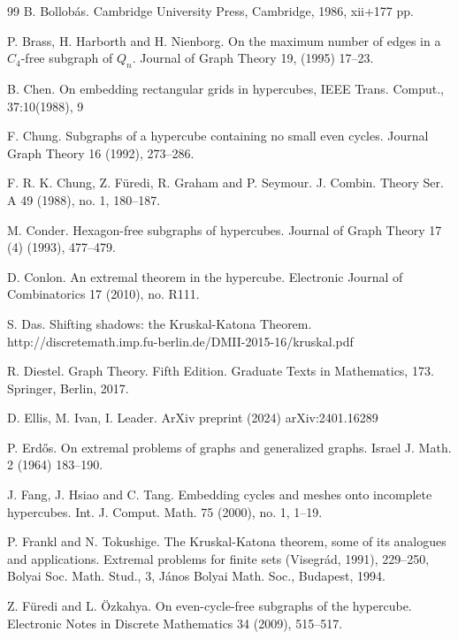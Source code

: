 \documentclass[11pt, a4paper]{article}
\begin{document}
\begin{thebibliography}{99}
 B. Bollob\'as. 
Cambridge University Press, Cambridge, 1986, xii+177 pp.


P. Brass, H. Harborth and H. Nienborg.
\newblock On the maximum number of edges in a $C_4$-free subgraph of $Q_n$.
Journal of Graph Theory 19, (1995)  17--23.


 B. Chen.  On embedding rectangular grids in hypercubes, IEEE Trans. Comput., 37:10(1988), 9


F. Chung.
\newblock Subgraphs of a hypercube containing no small even cycles. 
Journal Graph Theory 16 (1992), 273--286.


 F. R. K. Chung, Z. F\"uredi, R. Graham and P. Seymour.
J. Combin. Theory Ser. A 49 (1988), no. 1, 180--187.

M. Conder.
\newblock Hexagon-free subgraphs of hypercubes.
Journal of Graph Theory 17 (4) (1993), 477--479.

D. Conlon.
\newblock An extremal theorem in the hypercube.
Electronic Journal of Combinatorics 17 (2010), no. R111.

 S. Das. Shifting shadows: the Kruskal-Katona Theorem.  http://discretemath.imp.fu-berlin.de/DMII-2015-16/kruskal.pdf


R. Diestel. 
\newblock Graph Theory. Fifth Edition. 
Graduate Texts in Mathematics, 173. Springer, Berlin, 2017.


D. Ellis, M. Ivan, I. Leader.
ArXiv preprint (2024) arXiv:2401.16289 

P. Erd\H{o}s.
\newblock On extremal problems of graphs and generalized graphs.
Israel J. Math. 2 (1964) 183--190.


  J. Fang,  J. Hsiao and   C.  Tang.
Embedding cycles and meshes onto incomplete hypercubes.
Int. J. Comput. Math. 75 (2000), no. 1, 1--19.




 P. Frankl and  N. Tokushige.
The Kruskal-Katona theorem, some of its analogues and applications. Extremal problems for finite sets (Visegr\'ad, 1991), 229--250,
Bolyai Soc. Math. Stud., 3, J\'anos Bolyai Math. Soc., Budapest, 1994.



Z. F\"uredi and L. \"{O}zkahya.
\newblock On even-cycle-free subgraphs of the hypercube.
Electronic Notes in Discrete Mathematics 34 (2009), 515--517.


\end{thebibliography}
\end{document}
